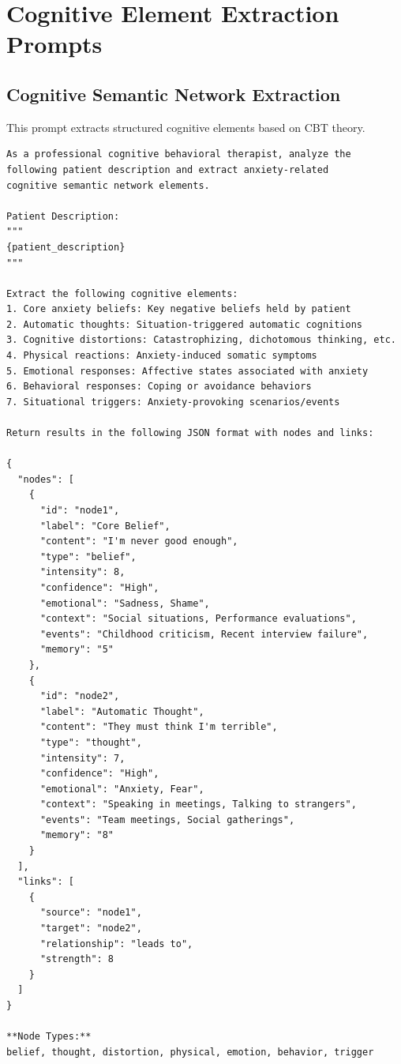 \documentclass[sigconf,review,anonymous]{acmart}
\begin{document}
\section{Cognitive Element Extraction Prompts}
\label{sec:cognitive}

\subsection{Cognitive Semantic Network Extraction}

This prompt extracts structured cognitive elements based on CBT theory.

\begin{lstlisting}
As a professional cognitive behavioral therapist, analyze the 
following patient description and extract anxiety-related 
cognitive semantic network elements.

Patient Description:
"""
{patient_description}
"""

Extract the following cognitive elements:
1. Core anxiety beliefs: Key negative beliefs held by patient
2. Automatic thoughts: Situation-triggered automatic cognitions
3. Cognitive distortions: Catastrophizing, dichotomous thinking, etc.
4. Physical reactions: Anxiety-induced somatic symptoms
5. Emotional responses: Affective states associated with anxiety
6. Behavioral responses: Coping or avoidance behaviors
7. Situational triggers: Anxiety-provoking scenarios/events

Return results in the following JSON format with nodes and links:

{
  "nodes": [
    {
      "id": "node1",
      "label": "Core Belief",
      "content": "I'm never good enough",
      "type": "belief",
      "intensity": 8,
      "confidence": "High",
      "emotional": "Sadness, Shame",
      "context": "Social situations, Performance evaluations",
      "events": "Childhood criticism, Recent interview failure",
      "memory": "5"
    },
    {
      "id": "node2",
      "label": "Automatic Thought",
      "content": "They must think I'm terrible",
      "type": "thought",
      "intensity": 7,
      "confidence": "High",
      "emotional": "Anxiety, Fear",
      "context": "Speaking in meetings, Talking to strangers",
      "events": "Team meetings, Social gatherings",
      "memory": "8"
    }
  ],
  "links": [
    {
      "source": "node1",
      "target": "node2",
      "relationship": "leads to",
      "strength": 8
    }
  ]
}

**Node Types:** 
belief, thought, distortion, physical, emotion, behavior, trigger


\end{lstlisting}
\end{document}
